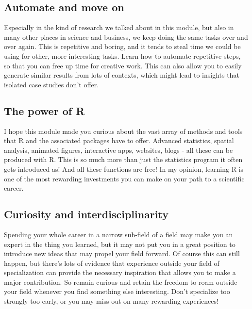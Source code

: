 \documentclass[
]{book}
\begin{document}
\hypertarget{automate-and-move-on}{%
\subsection{Automate and move on}\label{automate-and-move-on}}

Especially in the kind of research we talked about in this module, but also in many other places in science and business, we keep doing the same tasks over and over again. This is repetitive and boring, and it tends to steal time we could be using for other, more interesting tasks. Learn how to automate repetitive steps, so that you can free up time for creative work. This can also allow you to easily generate similar results from lots of contexts, which might lead to insights that isolated case studies don't offer.

\hypertarget{the-power-of-r}{%
\subsection{The power of R}\label{the-power-of-r}}

I hope this module made you curious about the vast array of methods and tools that R and the associated packages have to offer. Advanced statistics, spatial analysis, animated figures, interactive apps, websites, blogs - all these can be produced with R. This is so much more than just the statistics program it often gets introduced as! And all these functions are free! In my opinion, learning R is one of the most rewarding investments you can make on your path to a scientific career.

\hypertarget{curiosity-and-interdisciplinarity}{%
\subsection{Curiosity and interdisciplinarity}\label{curiosity-and-interdisciplinarity}}

Spending your whole career in a narrow sub-field of a field may make you an expert in the thing you learned, but it may not put you in a great position to introduce new ideas that may propel your field forward. Of course this can still happen, but there's lots of evidence that experience outside your field of specialization can provide the necessary inspiration that allows you to make a major contribution. So remain curious and retain the freedom to roam outside your field whenever you find something else interesting. Don't specialize too strongly too early, or you may miss out on many rewarding experiences!
\end{document}
